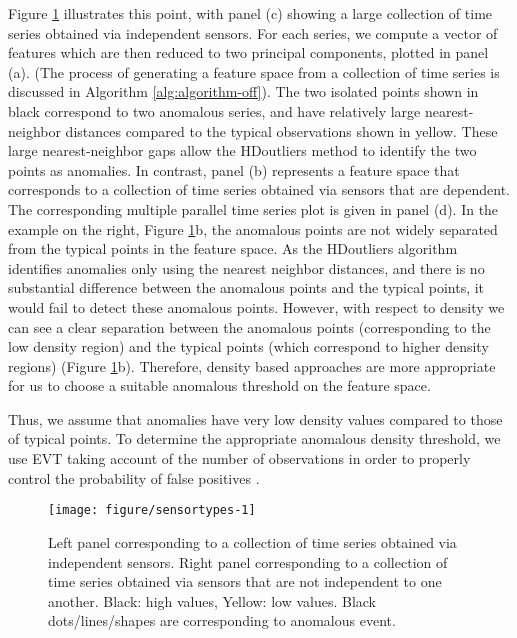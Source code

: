 \documentclass[12pt]{article}
\begin{document}
Figure \ref{fig:sensortypes} illustrates this point, with panel (c)
showing a large collection of time series obtained via independent
sensors. For each series, we compute a vector of features which are then
reduced to two principal components, plotted in panel (a). (The process
of generating a feature space from a collection of time series is
discussed in Algorithm \ref{alg:algorithm-off}). The two isolated points
shown in black correspond to two anomalous series, and have relatively
large nearest-neighbor distances compared to the typical observations
shown in yellow. These large nearest-neighbor gaps allow the HDoutliers
method to identify the two points as anomalies. In contrast, panel (b)
represents a feature space that corresponds to a collection of time
series obtained via sensors that are dependent. The corresponding
multiple parallel time series plot is given in panel (d). In the example
on the right, Figure \ref{fig:sensortypes}b, the anomalous points are
not widely separated from the typical points in the feature space. As
the HDoutliers algorithm identifies anomalies only using the nearest
neighbor distances, and there is no substantial difference between the
anomalous points and the typical points, it would fail to detect these
anomalous points. However, with respect to density we can see a clear
separation between the anomalous points (corresponding to the low
density region) and the typical points (which correspond to higher
density regions) (Figure \ref{fig:sensortypes}b). Therefore, density
based approaches are more appropriate for us to choose a suitable
anomalous threshold on the feature space.

Thus, we assume that anomalies have very low density values compared to
those of typical points. To determine the appropriate anomalous density
threshold, we use EVT taking account of the number of observations in
order to properly control the probability of false positives
\citep{clifton2011novelty}.

\begin{figure}[ht]

{\centering \texttt{[image: figure/sensortypes-1]} 

}

\caption{Left panel corresponding to a collection of time series obtained via independent sensors. Right panel corresponding to a collection of time series obtained via sensors that are not independent to one another. Black: high values, Yellow: low values. Black dots/lines/shapes are corresponding to anomalous event.}\label{fig:sensortypes}
\end{figure}
\end{document}
